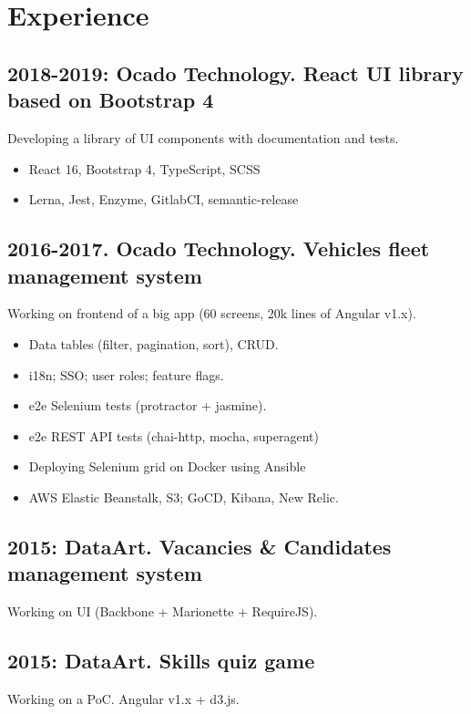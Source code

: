 \documentclass[a4paper, 14pt]{article}
\begin{document}
\section{Experience}
  \subsection{2018-2019: Ocado Technology. React UI library based on Bootstrap 4}
    Developing a library of UI components with documentation and tests.
    \begin{itemize}
      \item React 16, Bootstrap 4, TypeScript, SCSS \\ 
      \item Lerna, Jest, Enzyme, GitlabCI, semantic-release
    \end{itemize}
  \subsection{2016-2017. Ocado Technology. Vehicles fleet management system}
    Working on frontend of a big app (60 screens, 20k lines of Angular v1.x).
    \begin{itemize}
      \item Data tables (filter, pagination, sort), CRUD. \\
      \item i18n; SSO; user roles; feature flags. \\
      \item e2e Selenium tests (protractor + jasmine). \\
      \item e2e REST API tests (chai-http, mocha, superagent) \\
      \item Deploying Selenium grid on Docker using Ansible \\
      \item AWS Elastic Beanstalk, S3; GoCD, Kibana, New Relic.
    \end{itemize}

  \subsection{2015: DataArt. Vacancies \& Candidates management system}
    Working on UI (Backbone + Marionette + RequireJS).
  \subsection{2015: DataArt. Skills quiz game}
    Working on a PoC. Angular v1.x + d3.js.
\end{document}
